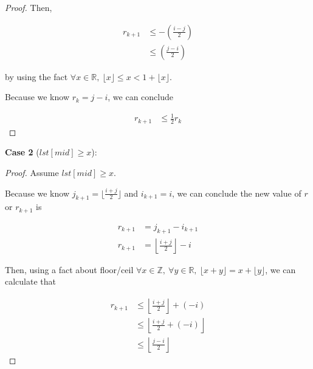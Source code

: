 \documentclass[12pt]{article}
\begin{document}
\begin{enumerate}[a.]
\begin{proof}
        \bigskip

        Then,

        \begin{align}
            r_{k+1} &\leq - \left( \frac{i - j}{2} \right)\\
            &\leq \left( \frac{j - i}{2} \right)
        \end{align}

        by using the fact $\forall x \in \mathbb{R},\: \lfloor x \rfloor \leq x < 1 + \lfloor x \rfloor$.

        \bigskip

        Because we know $r_k = j - i$, we can conclude

        \begin{align}
            r_{k+1} &\leq \frac{1}{2} r_k
        \end{align}
    \end{proof}

    \bigskip

    \textbf{Case 2} ($lst[mid] \geq x$):

    \bigskip

    \begin{proof}

        Assume $lst[mid] \geq x$.

        \bigskip

        Because we know $j_{k+1} = \lfloor \frac{i + j}{2} \rfloor$
        and $i_{k+1} = i$, we can conclude the new value of $r$ or $r_{k+1}$ is

        \setcounter{equation}{0}
        \begin{align}
            r_{k+1} &= j_{k+1}  - i_{k+1}\\
            r_{k+1} &= \left\lfloor \frac{i+j}{2} \right\rfloor - i
        \end{align}

        \bigskip

        Then, using a fact about floor/ceil $\forall x \in \mathbb{Z},\:\forall y \in
        \mathbb{R},\:\lfloor x+y \rfloor = x + \lfloor y \rfloor$, we can calculate that

        \begin{align}
            r_{k+1} &\leq \left\lfloor \frac{i + j}{2} \right\rfloor + (-i)\\
            &\leq \left\lfloor \frac{i + j}{2} + (-i) \right\rfloor\\
            &\leq \left\lfloor \frac{j - i}{2} \right\rfloor
        \end{align}


\end{proof}
\end{enumerate}
\end{document}
